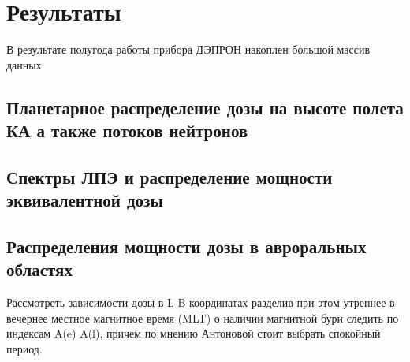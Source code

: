 
\chapter{Результаты}\label{chapt_results}
В результате полугода работы прибора ДЭПРОН накоплен большой массив данных

\section{Планетарное распределение дозы на высоте полета КА а также потоков нейтронов}

\section{Спектры ЛПЭ и распределение мощности эквивалентной дозы}


\section{Распределения мощности дозы в авроральных областях}

Рассмотреть зависимости дозы в L-B координатах разделив при этом утреннее в вечернее местное магнитное время (MLT) о наличии магнитной бури следить по индексам A(e) A(l), причем по мнению Антоновой стоит выбрать спокойный период.